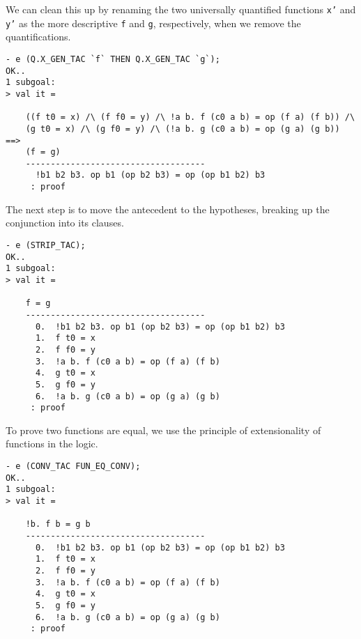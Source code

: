 We can clean this up by renaming the two universally quantified functions
\texttt{x'} and \texttt{y'} as the more descriptive
\texttt{f} and \texttt{g}, respectively, when we remove the quantifications.
%
\begin{session}
\begin{verbatim}
- e (Q.X_GEN_TAC `f` THEN Q.X_GEN_TAC `g`);
OK..
1 subgoal:
> val it =
    
    ((f t0 = x) /\ (f f0 = y) /\ !a b. f (c0 a b) = op (f a) (f b)) /\
    (g t0 = x) /\ (g f0 = y) /\ (!a b. g (c0 a b) = op (g a) (g b)) ==>
    (f = g)
    ------------------------------------
      !b1 b2 b3. op b1 (op b2 b3) = op (op b1 b2) b3
     : proof
\end{verbatim}
\end{session}

The next step is to move the antecedent to the hypotheses, breaking up the
conjunction into its clauses.
%
\begin{session}
\begin{verbatim}
- e (STRIP_TAC);
OK..
1 subgoal:
> val it =
    
    f = g
    ------------------------------------
      0.  !b1 b2 b3. op b1 (op b2 b3) = op (op b1 b2) b3
      1.  f t0 = x
      2.  f f0 = y
      3.  !a b. f (c0 a b) = op (f a) (f b)
      4.  g t0 = x
      5.  g f0 = y
      6.  !a b. g (c0 a b) = op (g a) (g b)
     : proof
\end{verbatim}
\end{session}

To prove two functions are equal, we use the principle of extensionality
of functions in the logic.
%
\begin{session}
\begin{verbatim}
- e (CONV_TAC FUN_EQ_CONV);
OK..
1 subgoal:
> val it =
    
    !b. f b = g b
    ------------------------------------
      0.  !b1 b2 b3. op b1 (op b2 b3) = op (op b1 b2) b3
      1.  f t0 = x
      2.  f f0 = y
      3.  !a b. f (c0 a b) = op (f a) (f b)
      4.  g t0 = x
      5.  g f0 = y
      6.  !a b. g (c0 a b) = op (g a) (g b)
     : proof
\end{verbatim}
\end{session}

